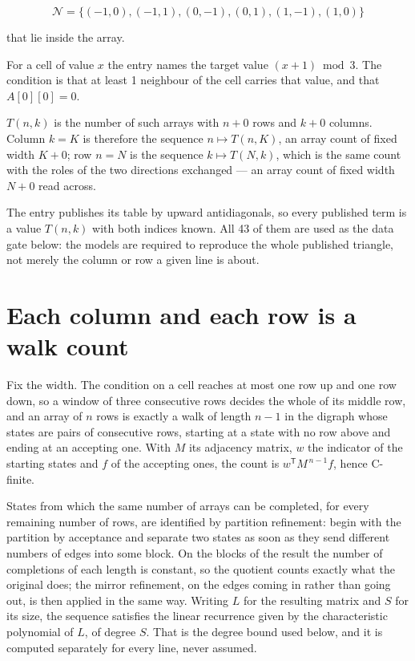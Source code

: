 \documentclass[11pt]{article}
\theoremstyle{definition}
\begin{document}
\[\mathcal{N} = \{(-1,0), (-1,1), (0,-1), (0,1), (1,-1), (1,0)\}\]

that lie inside the array.

For a cell of value $x$ the entry names the target value $(x + 1) \bmod 3$. The condition is that at least 1 neighbour of the cell carries that value, and that $A[0][0] = 0$.

$T(n,k)$ is the number of such arrays with $n + 0$ rows and $k + 0$ columns. Column $k = K$ is therefore the sequence $n \mapsto T(n,K)$, an array count of fixed width $K + 0$; row $n = N$ is the sequence $k \mapsto T(N,k)$, which is the same count with the roles of the two directions exchanged --- an array count of fixed width $N + 0$ read across.

The entry publishes its table by upward antidiagonals, so every published term is a value $T(n,k)$ with both indices known. All 43 of them are used as the data gate below: the models are required to reproduce the whole published triangle, not merely the column or row a given line is about.

\section{Each column and each row is a walk count}

Fix the width. The condition on a cell reaches at most one row up and one row down, so a window of three consecutive rows decides the whole of its middle row, and an array of $n$ rows is exactly a walk of length $n-1$ in the digraph whose states are pairs of consecutive rows, starting at a state with no row above and ending at an accepting one. With $M$ its adjacency matrix, $w$ the indicator of the starting states and $f$ of the accepting ones, the count is $w^{\mathsf T}M^{\,n-1}f$, hence C-finite.

States from which the same number of arrays can be completed, for every remaining number of rows, are identified by partition refinement: begin with the partition by acceptance and separate two states as soon as they send different numbers of edges into some block. On the blocks of the result the number of completions of each length is constant, so the quotient counts exactly what the original does; the mirror refinement, on the edges coming in rather than going out, is then applied in the same way. Writing $L$ for the resulting matrix and $S$ for its size, the sequence satisfies the linear recurrence given by the characteristic polynomial of $L$, of degree $S$. That is the degree bound used below, and it is computed separately for every line, never assumed.
\end{document}
